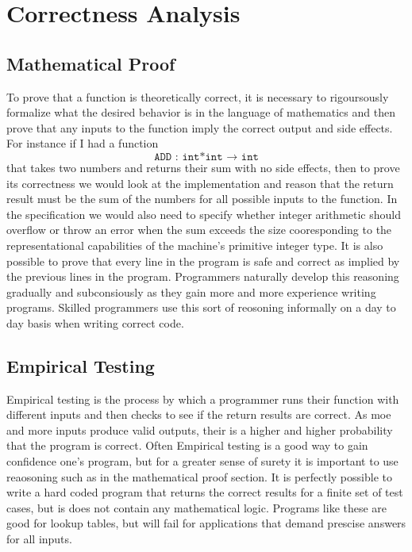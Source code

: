 \documentclass[12pt, letterpaper]{book}
\begin{document}
	\section{Correctness Analysis}

		\subsection{Mathematical Proof}

To prove that a function is theoretically correct, it is necessary to rigoursously formalize what the desired behavior is in the language of mathematics and then prove that any inputs to the function imply the correct output and side effects. 
	For instance if I had a function $$\texttt{ADD : int*int $\rightarrow$ int}$$ that takes two numbers and returns their sum with no side effects, then to prove its correctness we would look at the implementation and reason that the return result must be the sum of the numbers for all possible inputs to the function. In the specification we would also need to specify whether integer arithmetic should overflow or throw an error when the sum exceeds the size cooresponding to the representational capabilities of the machine's primitive integer type.
	It is also possible to prove that every line in the program is safe and correct as implied by the previous lines in the program. Programmers naturally develop this reasoning gradually and subconsiously as they gain more and more experience writing programs. Skilled programmers use this sort of reosoning informally on a day to day basis when writing correct code.

		\subsection{Empirical Testing}

	Empirical testing is the process by which a programmer runs their function with different inputs and then checks to see if the return results are correct. As moe and more inputs produce valid outputs, their is a higher and higher probability that the program is correct. Often Empirical testing is a good way to gain confidence one's program, but for a greater sense of surety it is important to use reaosoning such as in the mathematical proof section. It is perfectly possible to write a hard coded program that returns the correct results for a finite set of test cases, but is does not contain any mathematical logic. Programs like these are good for lookup tables, but will fail for applications that demand prescise answers for all inputs.
\end{document}
